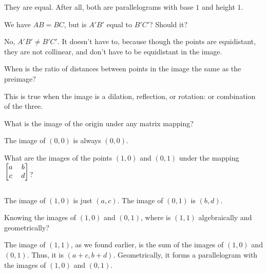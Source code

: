 \documentclass[../gatm_answers.tex]{subfiles}
\begin{document}
They are equal. After all, both are parallelograms with base $1$ and height $1$.

\begin{inner_problem}
\item We have $AB=BC$, but is $A'B'$ equal to $B'C'$? Should it?
\end{inner_problem}

No, $A'B' \neq B'C'$. It doesn't have to, because though the points are equidistant, they are not collinear, and don't have to be equidistant in the image.

\begin{outer_problem}
\item
\end{outer_problem}

\begin{inner_problem}[start=1]
\item When is the ratio of distances between points in the image the same as the preimage?
\end{inner_problem}

This is true when the image is a dilation, reflection, or rotation: or combination of the three.

\begin{inner_problem}
\item What is the image of the origin under any matrix mapping?
\end{inner_problem}

The image of $(0,0)$ is always $(0,0)$.

\begin{inner_problem}
\item What are the images of the points $(1,0)$ and $(0,1)$ under the mapping $\begin{blockarray}{[cc]} a & b \\ c & d \end{blockarray}$?
\end{inner_problem}

The image of $(1,0)$ is just $(a,c)$. The image of $(0,1)$ is $(b,d)$.

\begin{inner_problem}
\item Knowing the images of $(1,0)$ and $(0,1)$, where is $(1,1)$ algebraically and geometrically?
\end{inner_problem}

The image of $(1,1)$, as we found earlier, is the sum of the images of $(1,0)$ and $(0,1)$. Thus, it is $(a+c,b+d)$. Geometrically, it forms a parallelogram with the images of $(1,0)$ and $(0,1)$.
\end{document}
